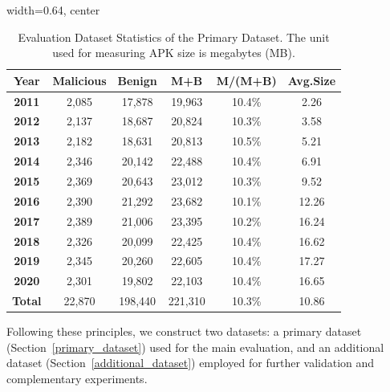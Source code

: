 \begin{table}[t]
    \renewcommand{\arraystretch}{0.9}
    \centering
    \caption{Evaluation Dataset Statistics of the Primary Dataset.
    The unit used for measuring APK size is megabytes (MB).}
    \begin{adjustbox}{width=0.64\linewidth, center}
    \begin{tabular}{c|ccccc}
    \hline
    \textbf{Year}  & \textbf{Malicious} & \textbf{Benign} & \textbf{M+B} & \textbf{M/(M+B)} & \textbf{Avg.Size} \\ \hline
    \textbf{2011}  & 2,085   & 17,878   & 19,963& 10.4\%& 2.26   \\
    \textbf{2012}  & 2,137   & 18,687   & 20,824& 10.3\%& 3.58   \\
    \textbf{2013}  & 2,182   & 18,631   & 20,813& 10.5\%& 5.21   \\
    \textbf{2014}  & 2,346   & 20,142   & 22,488& 10.4\%& 6.91   \\
    \textbf{2015}  & 2,369   & 20,643   & 23,012& 10.3\%& 9.52   \\
    \textbf{2016}  & 2,390   & 21,292   & 23,682& 10.1\%& 12.26  \\
    \textbf{2017}  & 2,389   & 21,006   & 23,395& 10.2\%& 16.24  \\
    \textbf{2018}  & 2,326   & 20,099   & 22,425& 10.4\%& 16.62  \\
    \textbf{2019}  & 2,345   & 20,260   & 22,605& 10.4\%& 17.27  \\
    \textbf{2020}  & 2,301   & 19,802   & 22,103& 10.4\%& 16.65  \\ \hline
    \textbf{Total} & 22,870  & 198,440  & 221,310      & 10.3\%& 10.86  \\ \hline
    \end{tabular}
    \end{adjustbox}
    \label{tab:dataset_stat}
    \vspace{-0.3cm}
\end{table}

Following these principles, we construct two datasets: a primary dataset (Section~\ref{primary_dataset}) used for the main evaluation, and an additional dataset (Section~\ref{additional_dataset}) employed for further validation and complementary experiments.




